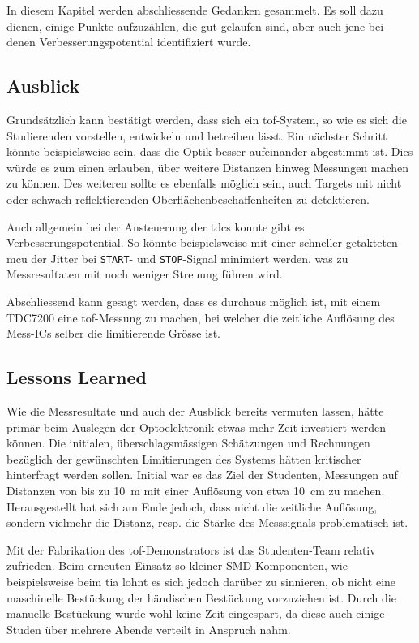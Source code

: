 In diesem Kapitel werden abschliessende Gedanken gesammelt. Es soll dazu dienen, einige Punkte aufzuzählen, die gut gelaufen
sind, aber auch jene bei denen Verbesserungspotential identifiziert wurde.

\subsection{Ausblick}
Grundsätzlich kann bestätigt werden, dass sich ein \acrshort{tof}-System, so wie es sich die Studierenden vorstellen,
entwickeln und betreiben lässt. Ein nächster Schritt könnte beispielsweise sein, dass die Optik besser aufeinander
abgestimmt ist. Dies würde es zum einen erlauben, über weitere Distanzen hinweg Messungen machen zu können. Des weiteren
sollte es ebenfalls möglich sein, auch Targets mit nicht oder schwach reflektierenden Oberflächenbeschaffenheiten zu detektieren.

Auch allgemein bei der Ansteuerung der \acrshort{tdc}s konnte gibt es Verbesserungspotential. So könnte beispielsweise
mit einer schneller getakteten \acrshort{mcu} der Jitter bei \lstinline|START|- und \lstinline|STOP|-Signal minimiert
werden, was zu Messresultaten mit noch weniger Streuung führen wird.

Abschliessend kann gesagt werden, dass es durchaus möglich ist, mit einem TDC7200 eine \acrshort{tof}-Messung zu machen,
bei welcher die zeitliche Auflösung des Mess-ICs selber die limitierende Grösse ist.

\subsection{Lessons Learned}
Wie die Messresultate und auch der Ausblick bereits vermuten lassen, hätte primär beim Auslegen der Optoelektronik etwas
mehr Zeit investiert werden können. Die initialen, überschlagsmässigen Schätzungen und Rechnungen bezüglich der gewünschten
Limitierungen des Systems hätten kritischer hinterfragt werden sollen. Initial war es das Ziel der Studenten, Messungen
auf Distanzen von bis zu 10~m mit einer Auflösung von etwa 10~cm zu machen. Herausgestellt hat sich am Ende jedoch, dass
nicht die zeitliche Auflösung, sondern vielmehr die Distanz, resp. die Stärke des Messsignals problematisch ist.

Mit der Fabrikation des \acrshort{tof}-Demonstrators ist das Studenten-Team relativ zufrieden. Beim erneuten Einsatz so
kleiner SMD-Komponenten, wie beispielsweise beim \acrshort{tia} lohnt es sich jedoch darüber zu sinnieren, ob nicht eine
maschinelle Bestückung der händischen Bestückung vorzuziehen ist. Durch die manuelle Bestückung wurde wohl keine Zeit
eingespart, da diese auch einige Studen über mehrere Abende verteilt in Anspruch nahm.

